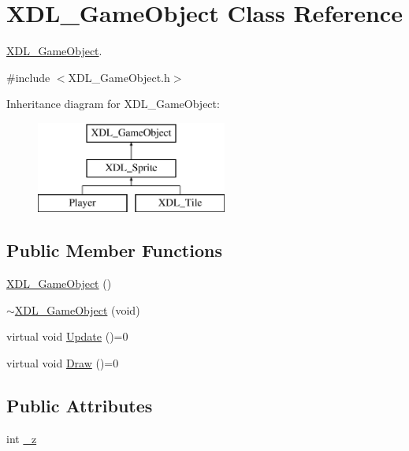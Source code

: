 \hypertarget{class_x_d_l___game_object}{\section{X\-D\-L\-\_\-\-Game\-Object Class Reference}
\label{class_x_d_l___game_object}
}


\hyperlink{class_x_d_l___game_object}{X\-D\-L\-\_\-\-Game\-Object}.  




{\ttfamily \#include $<$X\-D\-L\-\_\-\-Game\-Object.\-h$>$}

Inheritance diagram for X\-D\-L\-\_\-\-Game\-Object\-:\begin{figure}[H]
\begin{center}
\leavevmode
\includegraphics[height=3.000000cm]{class_x_d_l___game_object}
\end{center}
\end{figure}
\subsection*{Public Member Functions}
\begin{DoxyCompactItemize}
\item 
\hyperlink{class_x_d_l___game_object_a7d853f19561fa684d312f07a8ac4e1f2}{X\-D\-L\-\_\-\-Game\-Object} ()
\item 
\hyperlink{class_x_d_l___game_object_a27fd4e872e6e1bb063f5d1c8acf3119c}{$\sim$\-X\-D\-L\-\_\-\-Game\-Object} (void)
\item 
virtual void \hyperlink{class_x_d_l___game_object_a23ac8b886032939259f143081a3b1fab}{Update} ()=0
\item 
virtual void \hyperlink{class_x_d_l___game_object_a46ab89c9622631cf13114a493b1b0a2d}{Draw} ()=0
\end{DoxyCompactItemize}
\subsection*{Public Attributes}
\begin{DoxyCompactItemize}
\item 
int \hyperlink{class_x_d_l___game_object_a62a08106992c783507c669f71a6dd6a6}{\-\_\-z}
\end{DoxyCompactItemize}


